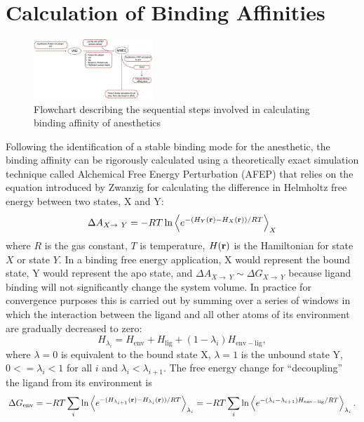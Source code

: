 \documentclass[12pt]{article}
\begin{document}
\section{Calculation of Binding Affinities}
\begin{figure}
\begin{center}
\centering
\includegraphics[width =  0.4\textwidth]{finlpics/Flowchart_FEP}
\caption{Flowchart describing  the sequential steps involved in calculating binding affinity of anesthetics}
\label{fig:flowchart_FEP}
\end{center}
\end{figure}
Following the identification of a stable binding mode for the anesthetic, the binding affinity can be rigorously calculated using a theoretically exact simulation technique called Alchemical Free Energy Perturbation (AFEP) that relies on the equation introduced by Zwanzig\cite{Zwanzig1954} for calculating the difference in Helmholtz free energy between two states, X and Y:
\begin{equation}
\Delta A_{X\rightarrow~Y} = -R T \ln \left \langle  e^{-({H_{Y}({\bf r})-H_{X}({\bf r})})/R T} \right \rangle_{X}
\end{equation}
where $R$ is the gas constant, $T$ is temperature, $H({\bf r})$ is the Hamiltonian for state $X$ or state $Y$. In a binding free energy application, X would represent the bound state, Y would represent the apo state, and $\Delta A_{X\rightarrow~Y} \sim \Delta G_{X\rightarrow~Y}$ because ligand binding will not significantly change the system volume. In practice \cite{Beveridge1989,Mark2002} for convergence purposes this is carried out by summing over a series of windows in which the interaction between the ligand and all other atoms of its environment are gradually decreased to zero: 
\begin{equation}
H_{\lambda_{i}} = H_{\mathrm{env}} + H_{\mathrm{lig}} + (1 - \lambda_{i}) H_{\mathrm{env-lig}} , 
\end{equation} 
where $\lambda = 0$ is equivalent to the bound state X, $\lambda = 1$ is the unbound state Y, $0<=\lambda_{i}<1$ for all $i$ and $\lambda_{i}<\lambda_{i+1}$. The free energy change for ``decoupling'' the ligand from its environment is 
\begin{equation}
\Delta G_{\mathrm{env}} = -R T \sum_{i}   \ln \left \langle  e^{-({H_{\lambda_{i+1}}({\bf r})-H_{\lambda_{i}}({\bf r})})/R T} \right \rangle_{\lambda_{i}} = -R T \sum_{i}   \ln \left \langle  e^{-( \lambda_{i} - \lambda_{i+1}) H_{\mathrm{env-lig}}/R T} \right \rangle_{\lambda_{i}} \label{eq:lambda}. 
\end{equation}
\end{document}
